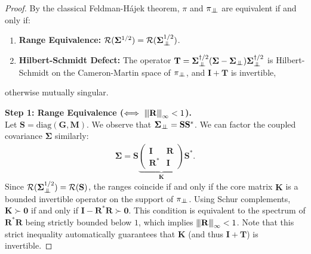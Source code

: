 \documentclass[noinfoline]{imsart}\setcounter{tocdepth}{2}
\newcommand{\m}[1]{\mathbf{#1}}
\renewcommand{\c}[1]{\mathcal{#1}}
\newcommand{\indep}{\perp\mkern-9.5mu\perp}
\newcommand{\vertiii}[1]{{\left\vert\kern-0.25ex\left\vert\kern-0.25ex\left\vert #1 
    \right\vert\kern-0.25ex\right\vert\kern-0.25ex\right\vert}} %
\theoremstyle{plain}
\begin{document}
\begin{proof}
By the classical Feldman-Hájek theorem, $\pi$ and $\pi_{\indep}$ are equivalent if and only if:
\begin{enumerate}[leftmargin = *]
    \item \textbf{Range Equivalence:} $\c{R}(\m{\Sigma}^{1/2}) = \c{R}(\m{\Sigma}_{\indep}^{1/2})$.
    \item \textbf{Hilbert-Schmidt Defect:} The operator $\m{T} = \m{\Sigma}_{\indep}^{\dagger/2} (\m{\Sigma} - \m{\Sigma}_{\indep}) \m{\Sigma}_{\indep}^{\dagger/2}$ is Hilbert-Schmidt on the Cameron-Martin space of $\pi_{\indep}$, and $\m{I} + \m{T}$ is invertible,
\end{enumerate}
otherwise mutually singular.

\noindent \textbf{Step 1: Range Equivalence ($ \Longleftrightarrow \ \vertiii{\m{R}}_{\infty} < 1$).} \\
Let $\m{S} = \text{diag}(\m{G}, \m{M})$. We observe that $\m{\Sigma}_{\indep} = \m{S}\m{S}^*$. We can factor the coupled covariance $\m{\Sigma}$ similarly:
\begin{align*}
    \m{\Sigma} = \m{S} \underbrace{\left(
    \begin{array}{c|c}
    \m{I} & \m{R} \\
    \hline
    \m{R}^* & \m{I}
    \end{array}
    \right)}_{\m{K}} \m{S}^*.
\end{align*}
Since $\c{R}(\m{\Sigma}_{\indep}^{1/2}) = \c{R}(\m{S})$, the ranges coincide if and only if the core matrix $\m{K}$ is a bounded invertible operator on the support of $\pi_{\indep}$.
Using Schur complements, $\m{K} \succ \m{0}$ if and only if $\m{I} - \m{R}^* \m{R} \succ \m{0}$. This condition is equivalent to the spectrum of $\m{R}^* \m{R}$ being strictly bounded below $1$, which implies $\vertiii{\m{R}}_{\infty} < 1$. Note that this strict inequality automatically guarantees that $\m{K}$ (and thus $\m{I}+\m{T}$) is invertible.


\end{proof}
\end{document}
